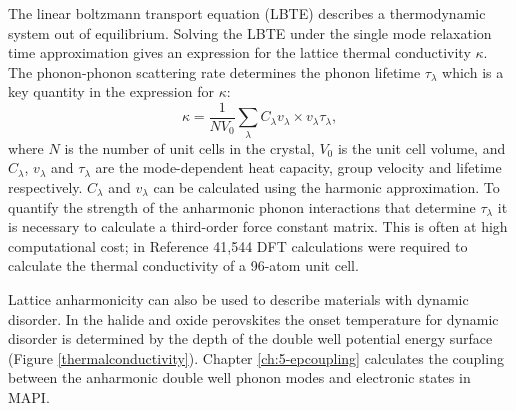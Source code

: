 The linear boltzmann transport equation (LBTE) describes a thermodynamic system out of equilibrium. Solving the LBTE under the single mode relaxation time approximation gives an expression for the lattice thermal conductivity $\kappa$.
The phonon-phonon scattering rate determines the phonon lifetime $\tau_\lambda$ which is a key quantity in the expression for $\kappa$:\autocite{Togo2015a}
\begin{equation}
    \label{thermalconductivity}
    \kappa=\frac{1}{NV_0}\sum_\lambda C_\lambda v_\lambda \times v_\lambda \tau_\lambda,
\end{equation}
where $N$ is the number of unit cells in the crystal, $V_0$ is the unit cell volume, and $C_\lambda$, $v_\lambda$ and $\tau_\lambda$ are the mode-dependent heat capacity, group velocity and lifetime respectively. $C_\lambda$ and $v_\lambda$ can be calculated using the harmonic approximation. To quantify the strength of the anharmonic phonon interactions that determine $\tau_\lambda$ it is necessary to calculate a third-order force constant matrix. This is often at high computational cost; in Reference \cite{Whalley2016} 41,544 DFT calculations were required to calculate the thermal conductivity of a 96-atom unit cell.

Lattice anharmonicity can also be used to describe materials with dynamic disorder. In the halide and oxide perovskites the onset temperature for dynamic disorder is determined by the depth of the double well potential energy surface (Figure \ref{thermalconductivity}).\autocite{Yang2017}
Chapter \ref{ch:5-epcoupling} calculates the coupling between the anharmonic double well phonon modes and electronic states in MAPI.





